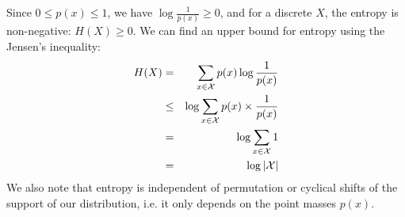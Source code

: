 Since $0\leq p(x) \leq 1$, we have $\log \frac{1}{p(x)} \geq 0$, and for a discrete $X$, the entropy is non-negative: $H(X)\geq 0$. We can find an upper bound for entropy using the Jensen's inequality:
\begin{eqnarray}
    H(X) &=& \sum_{x \in \cal X} p(x)\log \frac{1}{p(x)} \\
         &\leq& \log \sum_{x \in \cal X} p(x)\times \frac{1}{p(x)} \\
         &=& \log \sum_{x \in \cal X} 1 \\
         &=& \log |\cal X|
\end{eqnarray}
We also note that entropy is independent of permutation or cyclical shifts of the support of our distribution, i.e. it only depends on the point masses $p(x)$.\\

